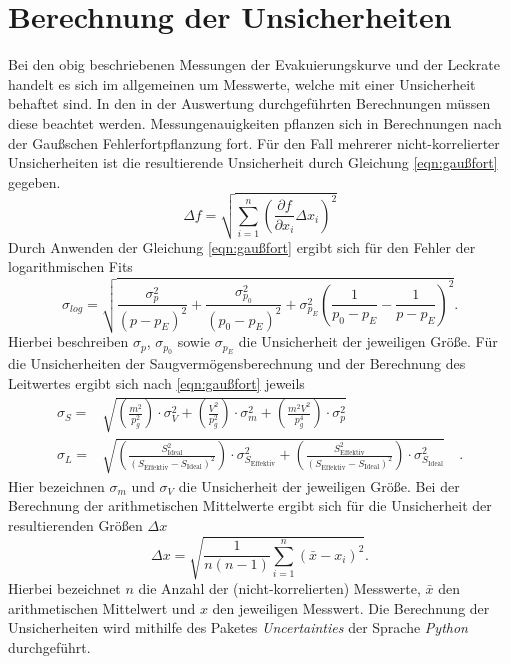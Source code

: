\section{Berechnung der Unsicherheiten}
\label{sec:unsicherheiten}
Bei den obig beschriebenen Messungen der Evakuierungskurve und der Leckrate handelt es sich
im allgemeinen um Messwerte, welche mit einer Unsicherheit behaftet sind. In den in der
Auswertung durchgeführten Berechnungen müssen diese beachtet werden. Messungenauigkeiten
pflanzen sich in Berechnungen nach der Gaußschen Fehlerfortpflanzung fort. Für den Fall mehrerer
nicht-korrelierter Unsicherheiten ist die resultierende Unsicherheit durch Gleichung \ref{eqn:gaußfort}
gegeben.
\begin{equation}
  \Delta f = \sqrt{\sum_{i=1}^{n} \left( \frac{\partial f}{\partial x_{i}} \Delta x_{i} \right)^{2}}
 \label{eqn:gaußfort}
\end{equation}
Durch Anwenden der Gleichung \ref{eqn:gaußfort} ergibt sich für den Fehler der logarithmischen Fits
\begin{equation}
  \sigma_{log} = \sqrt{\frac{\sigma_p^2}{(p-p_E)^2}+\frac{\sigma_{p_{0}}^2}{(p_0-p_E)^2}+\sigma_{p_E}^2 \left(\frac{1}{p_0-p_E}-\frac{1}{p-p_E}\right)^2}.
  \label{eqn:fehlerlog}
\end{equation}
Hierbei beschreiben $\sigma_{p}$, $\sigma_{p_{0}}$ sowie $\sigma_{p_{E}}$ die Unsicherheit der jeweiligen Größe.
Für die Unsicherheiten der Saugvermögensberechnung und der Berechnung des Leitwertes ergibt sich nach
\ref{eqn:gaußfort} jeweils
\begin{align}
  \sigma_{S} = & \sqrt{\left(\frac{m^2}{p_g^2}\right) \cdot \sigma_{V}^2 + \left(\frac{V^2}{p_g^2}\right) \cdot \sigma_m^2 + \left(\frac{m^2 V^2}{p_g^4}\right) \cdot \sigma_p^2} \\
  \sigma_{L} = & \sqrt{\left( \frac{ S_{\text{Ideal}}^2}{(S_{\text{Effektiv}}- S_{\text{Ideal}})^2} \right) \cdot \sigma_{S_{\text{Effektiv}}}^2 + \left( \frac{S_{\text{Effektiv}}^2}{(S_{\text{Effektiv}}- S_{\text{Ideal}})^2} \right) \cdot \sigma_{S_{\text{Ideal}}}^2} \quad.
  \label{eqn:fehlersaugleit}
\end{align}
Hier bezeichnen $\sigma_{m}$ und $\sigma_{V}$ die Unsicherheit der jeweiligen Größe.
Bei der Berechnung der arithmetischen Mittelwerte ergibt sich für die Unsicherheit der resultierenden
Größen $\Delta x$
\begin{equation}
 \Delta x = \sqrt{\frac{1}{n(n-1)} \sum_{i=1}^{n} (\bar{x} - x_{i})^{2}}.
\end{equation}
Hierbei bezeichnet $n$ die Anzahl der (nicht-korrelierten) Messwerte, $\bar{x}$ den arithmetischen Mittelwert
und $x$ den jeweiligen Messwert. Die Berechnung der Unsicherheiten wird mithilfe des Paketes
\textit{Uncertainties}\cite{uncertainties}
der Sprache \textit{Python}\cite{python} durchgeführt.
